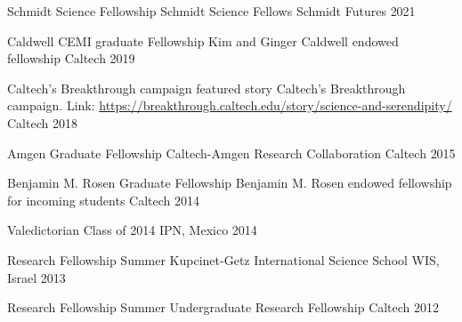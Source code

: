 \begin{cvhonors}

  \cvhonor
    {Schmidt Science Fellowship} %
    {Schmidt Science Fellows} %
    {Schmidt Futures} %
    {2021} %



  \cvhonor
    {Caldwell CEMI graduate Fellowship} %
    {Kim and Ginger Caldwell endowed fellowship} %
    {Caltech} %
    {2019} %

  \cvhonor
    {Caltech's Breakthrough campaign featured story}
    {Caltech's Breakthrough campaign. Link:
    \url{https://breakthrough.caltech.edu/story/science-and-serendipity/}} %
    {Caltech} %
    {2018} %

  \cvhonor
    {Amgen Graduate Fellowship} %
    {Caltech-Amgen Research Collaboration} %
    {Caltech} %
    {2015} %

  \cvhonor
    {Benjamin M. Rosen Graduate Fellowship} %
    {Benjamin M. Rosen endowed fellowship for incoming students} %
    {Caltech} %
    {2014} %

\end{cvhonors}
\begin{cvhonors}

  \cvhonor
    {Valedictorian} %
    {Class of 2014} %
    {IPN, Mexico} %
    {2014} %

  \cvhonor
    {Research Fellowship}
    {Summer Kupcinet-Getz International Science School}
    {WIS, Israel} %
    {2013} %

  \cvhonor
    {Research Fellowship}
    {Summer Undergraduate Research Fellowship}
    {Caltech} %
    {2012} %
\end{cvhonors}
